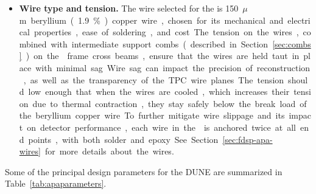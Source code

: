 \begin{itemize}
\item \textbf{Wire type and tension.}  The wire selected for the  is \SI{150}{$\mu$m} beryllium (\num{1.9}\%) copper wire, %
chosen for its mechanical and electrical properties, ease of soldering, and cost.  The tension on the wires, combined with intermediate support combs (described in Section~\ref{sec:combs}) on the  frame cross beams, ensure that the wires are held taut in place with minimal sag.  Wire sag can impact the precision of reconstruction, as well as the transparency of the TPC wire planes.  The tension should low enough that when the wires are cooled, which increases their tension due to thermal contraction, they stay safely below the break load of the beryllium copper wire.  To further mitigate wire slippage and its impact on detector performance, each wire in the  is anchored twice at all end points, with both solder and epoxy.  See Section~\ref{sec:fdsp-apa-wires} for more details about the wires.
\end{itemize}

Some of the principal design parameters for the DUNE 
 are summarized in Table~\ref{tab:apaparameters}.

